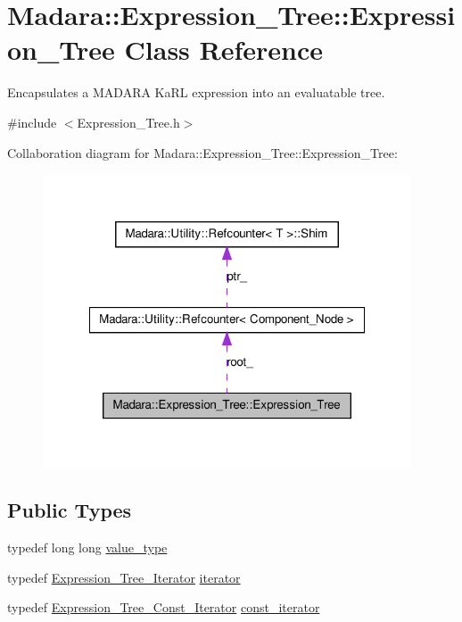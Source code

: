 \hypertarget{classMadara_1_1Expression__Tree_1_1Expression__Tree}{
\section{Madara::Expression\_\-Tree::Expression\_\-Tree Class Reference}
\label{da/d25/classMadara_1_1Expression__Tree_1_1Expression__Tree}
}


Encapsulates a MADARA KaRL expression into an evaluatable tree.  




{\ttfamily \#include $<$Expression\_\-Tree.h$>$}



Collaboration diagram for Madara::Expression\_\-Tree::Expression\_\-Tree:
\nopagebreak
\begin{figure}[H]
\begin{center}
\leavevmode
\includegraphics[width=310pt]{d9/def/classMadara_1_1Expression__Tree_1_1Expression__Tree__coll__graph}
\end{center}
\end{figure}
\subsection*{Public Types}
\begin{DoxyCompactItemize}
\item 
typedef long long \hyperlink{classMadara_1_1Expression__Tree_1_1Expression__Tree_ada1c181c09aa5564bf87fdc70e7bff4a}{value\_\-type}
\item 
typedef \hyperlink{classMadara_1_1Expression__Tree_1_1Expression__Tree__Iterator}{Expression\_\-Tree\_\-Iterator} \hyperlink{classMadara_1_1Expression__Tree_1_1Expression__Tree_a3292b7dd7babd755adb156fdc5122c06}{iterator}
\item 
typedef \hyperlink{classMadara_1_1Expression__Tree_1_1Expression__Tree__Const__Iterator}{Expression\_\-Tree\_\-Const\_\-Iterator} \hyperlink{classMadara_1_1Expression__Tree_1_1Expression__Tree_a8824934a03e87b54512cd7f09d301e43}{const\_\-iterator}
\end{DoxyCompactItemize}

